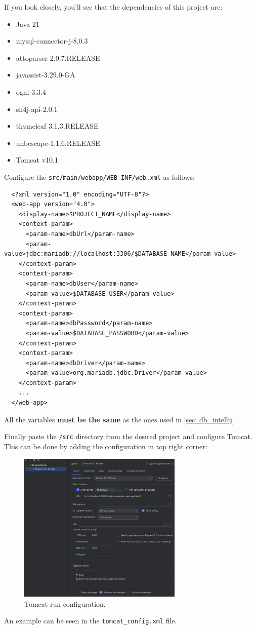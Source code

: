 \begin{warning}{}
  If you look closely, you'll see that the dependencies of this project are:
  \begin{itemize}
    \item Java 21
    \item mysql-connector-j-8.0.3
    \item attoparser-2.0.7.RELEASE
    \item javassist-3.29.0-GA
    \item ognl-3.3.4
    \item slf4j-api-2.0.1
    \item thymeleaf 3.1.3.RELEASE
    \item unbescape-1.1.6.RELEASE
    \item Tomcat v10.1
  \end{itemize}
\end{warning}

\newpage

Configure the \texttt{src/main/webapp/WEB-INF/web.xml} as follows:
\begin{verbatim}
  <?xml version="1.0" encoding="UTF-8"?>
  <web-app version="4.0">
    <display-name>$PROJECT_NAME</display-name>
    <context-param>
      <param-name>dbUrl</param-name>
      <param-value>jdbc:mariadb://localhost:3306/$DATABASE_NAME</param-value>
    </context-param>
    <context-param>
      <param-name>dbUser</param-name>
      <param-value>$DATABASE_USER</param-value>
    </context-param>
    <context-param>
      <param-name>dbPassword</param-name>
      <param-value>$DATABASE_PASSWORD</param-value>
    </context-param>
    <context-param>
      <param-name>dbDriver</param-name>
      <param-value>org.mariadb.jdbc.Driver</param-value>
    </context-param>
    ...
  </web-app>
\end{verbatim}

All the variables \textbf{must be the same} as the ones used in \autoref{sec: db_intellij}.

Finally paste the \texttt{/src} directory from the desired project and configure Tomcat. This can be done by adding the configuration in top right corner:
\begin{figure}[H]
  \centering
  \includegraphics[width=0.7\textwidth]{img/project_conversion/image.png}
  \caption{Tomcat run configuration.}
  \label{fig: tomcat_configuration}
\end{figure}
An example can be seen in the \texttt{tomcat\_config.xml} file.

